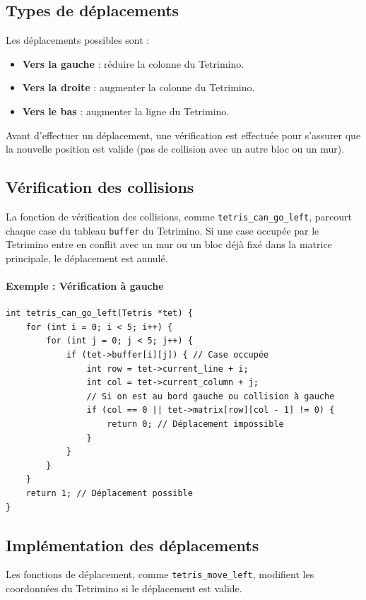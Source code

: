 \documentclass[12pt,a4paper]{report}
\begin{document}
\subsection{Types de déplacements}
Les déplacements possibles sont :
\begin{itemize}
    \item \textbf{Vers la gauche} : réduire la colonne du Tetrimino.
    \item \textbf{Vers la droite} : augmenter la colonne du Tetrimino.
    \item \textbf{Vers le bas} : augmenter la ligne du Tetrimino.
\end{itemize}

Avant d'effectuer un déplacement, une vérification est effectuée pour s'assurer que la nouvelle position est valide (pas de collision avec un autre bloc ou un mur).

\subsection{Vérification des collisions}
La fonction de vérification des collisions, comme \texttt{tetris\_can\_go\_left}, parcourt chaque case du tableau \texttt{buffer} du Tetrimino. Si une case occupée par le Tetrimino entre en conflit avec un mur ou un bloc déjà fixé dans la matrice principale, le déplacement est annulé.

\paragraph{Exemple : Vérification à gauche}
\begin{lstlisting}
int tetris_can_go_left(Tetris *tet) {
    for (int i = 0; i < 5; i++) {
        for (int j = 0; j < 5; j++) {
            if (tet->buffer[i][j]) { // Case occupée
                int row = tet->current_line + i;
                int col = tet->current_column + j;
                // Si on est au bord gauche ou collision à gauche
                if (col == 0 || tet->matrix[row][col - 1] != 0) {
                    return 0; // Déplacement impossible
                }
            }
        }
    }
    return 1; // Déplacement possible
}
\end{lstlisting}

\subsection{Implémentation des déplacements}
Les fonctions de déplacement, comme \texttt{tetris\_move\_left}, modifient les coordonnées du Tetrimino si le déplacement est valide.
\end{document}
